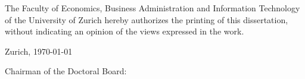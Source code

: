 \makeatletter
    \let\insertdate\@date
    \let\insertchairman\@chairman
\makeatother

\begin{titlepage}
    \begin{singlespace}
        \noindent
        The Faculty of Economics, Business Administration and Information Technology of the University of Zurich hereby authorizes the printing of this dissertation, without indicating an opinion of the views expressed in the work.
    
        \vspace{1cm}
        \noindent
        Zurich, \monthdayyeardate\today
        
        \vspace{0.4cm}
        \noindent
        Chairman of the Doctoral Board: \insertchairman
    \end{singlespace}
\end{titlepage}